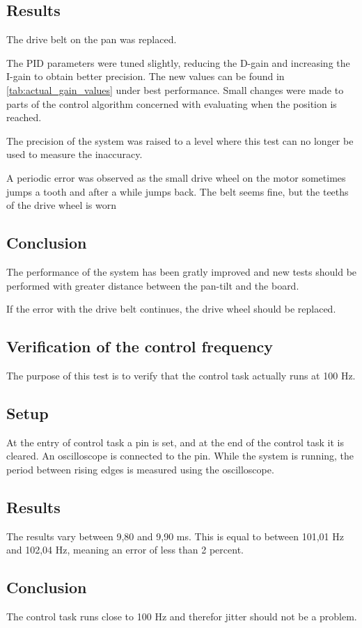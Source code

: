 \subsection*{Results}
The drive belt on the pan was replaced.

The PID parameters were tuned slightly, reducing the D-gain and increasing the
I-gain to obtain better precision. The new values can be found in
\ref{tab:actual_gain_values} under best performance. Small changes were made to
parts of the control algorithm concerned with evaluating when the position is reached.

The precision of the system was raised to a level where this test can no
longer be used to measure the inaccuracy. 

A periodic error was observed as the small drive wheel on the motor sometimes
jumps a tooth and after a while jumps back. The belt seems fine, but
the teeths of the drive wheel is worn

\subsection*{Conclusion}
The performance of the system has been gratly improved and new tests should be
performed with greater distance between the pan-tilt and the board. 

If the error with the drive belt continues, the drive wheel should be replaced.


\subsection{Verification of the control frequency}
The purpose of this test is to verify that the control task actually runs at 100 Hz.

\subsection*{Setup}
At the entry of control task a pin is set, and at the end of the control task it
is cleared. An oscilloscope is connected to the pin. While the system is running, the period between rising edges is measured using the oscilloscope.

\subsection*{Results}
The results vary between 9,80 and 9,90 ms. This is equal to between 101,01 Hz and 102,04 Hz, meaning an error of less than 2 percent.

\subsection*{Conclusion}
The control task runs close to 100 Hz and therefor jitter should not be a problem.









